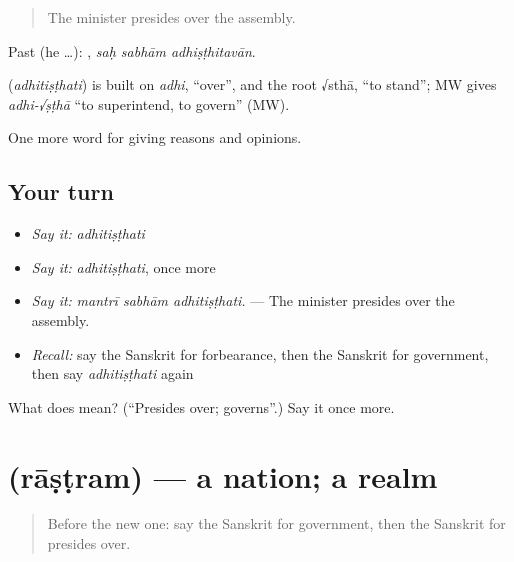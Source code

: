 \begin{quote}
The minister presides over the assembly.
\end{quote}

Past (he …):   , \emph{saḥ sabhām adhiṣṭhitavān}.

\begin{cousinweb}
\textbf{} (\emph{adhitiṣṭhati}) is built on \emph{adhi}, \textquotedblleft{}over\textquotedblright{}, and the root √sthā, \textquotedblleft{}to stand\textquotedblright{}; MW gives \emph{adhi-√ṣṭhā} \textquotedblleft{}to superintend, to govern\textquotedblright{} (MW).
\end{cousinweb}

\begin{grammarlens}[title={What you've built}]
One more word for giving reasons and opinions.
\end{grammarlens}

\subsection*{Your turn}
\begin{itemize}
\raggedright
  \item \emph{Say it:} \emph{adhitiṣṭhati}
  \item \emph{Say it:} \emph{adhitiṣṭhati}, once more
  \item \emph{Say it:} \emph{mantrī sabhām adhitiṣṭhati.} — The minister presides over the assembly.
  \item \emph{Recall:} say the Sanskrit for forbearance, then the Sanskrit for government, then say \emph{adhitiṣṭhati} again
\end{itemize}

\begin{tcolorbox}[breakable,colback=teal!4,colframe=teal!35!black,title={Before you move on}]
What does  mean? (\textquotedblleft{}Presides over; governs\textquotedblright{}.) Say it once more.
\end{tcolorbox}
\section[\texorpdfstring{\sk{राष्ट्रम्} (rāṣṭram)}{राष्ट्रम् (rāṣṭram)}]{ (rāṣṭram) — a nation; a realm}

\label{lesson:SA-C353-rastram}



\begin{quote}
Before the new one: say the Sanskrit for government, then the Sanskrit for presides over.
\end{quote}

